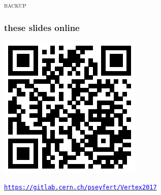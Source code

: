 \documentclass[table,xcolor=dvipsnames,professionalfonts]{beamer}
\newcommand{\myhref}[2]{\href{#1}{\footnotesize{\textcolor{blue}{\texttt{#2}}}}}
\begin{document}
\appendix



\begin{frame}
  \begin{center}
    \textcolor{bandgreen}{\Huge{\textsc{backup}}}
  \end{center}
\end{frame}


\begin{frame}
  \frametitle{these slides online}
  \includegraphics[width=.5\textwidth]{./qr.eps}

  \myhref{https://gitlab.cern.ch/pseyfert/Vertex2017}{https://gitlab.cern.ch/pseyfert/Vertex2017}
\end{frame}
\end{document}
